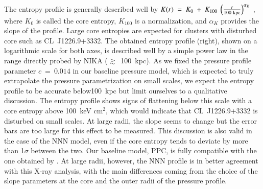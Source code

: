 \documentclass[twocolumn,traditabstract]{aa}
\begin{document}
The entropy profile is generally described well by $K(r)~=~K_0~+~K_{100}~\left(\frac{r}{100\ {\rm kpc}}\right)^{\alpha_K}$ \citep[e.g.,][]{pratt2010,cavagnolo2009}, where $K_0$ is called the core entropy, $K_{100}$ is a normalization, and $\alpha_K$ provides the slope of the profile. Large core entropies are expected for clusters with disturbed core such as \mbox{CL~J1226.9+3332}. The obtained entropy profile (right), shown on a logarithmic scale for both axes, is described well by a simple power law in the range directly probed by NIKA ($\gtrsim$~100~kpc). As we fixed the pressure profile parameter $c~=~0.014$ \citep{comis2011} in our baseline pressure model, which is expected to truly extrapolate the pressure parametrization on small scales, we expect the entropy profile to be accurate below100~kpc but limit ourselves to a qualitative discussion. The entropy profile shows signs of flattening below this scale with a core entropy above 100~keV cm$^2$, which would indicate that \mbox{CL~J1226.9+3332} is disturbed on small scales. At large radii, the slope seems to change but the error bars are too large for this effect to be measured. This discussion is also valid in the case of the NNN model, even if the core entropy tends to deviate by more than 1$\sigma$ between the two. Our baseline model, PPC, is fully compatible with the one obtained by \cite{maughan2007}. At large radii, however, the NNN profile is in better agreement with this \mbox{X-ray} analysis, with the main differences coming from the choice of the slope parameters at the core and the outer radii of the pressure profile.
\end{document}
